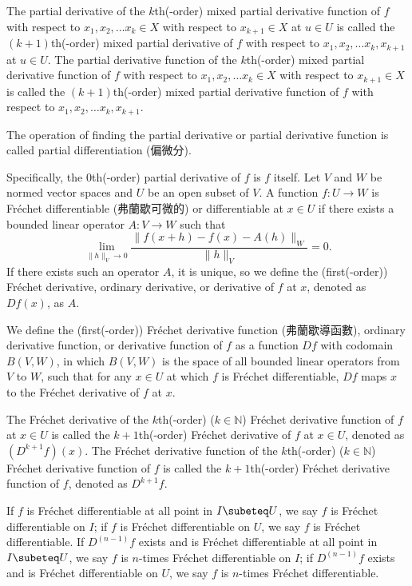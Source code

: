 \documentclass[a4paper,12pt]{report}
\begin{document}
The partial derivative of the $k$th(-order) mixed partial derivative function of $f$ with respect to $ x_1, x_2,\dots  x_k\in X$ with respect to $ x_{k+1}\in X$ at $u\in U$ is called the $(k+1)$th(-order) mixed partial derivative of $f$ with respect to $ x_1, x_2,\dots  x_k, x_{k+1}$ at $u\in U$. The partial derivative function of the $k$th(-order) mixed partial derivative function of $f$ with respect to $ x_1, x_2,\dots  x_k\in X$ with respect to $ x_{k+1}\in X$ is called the $(k+1)$th(-order) mixed partial derivative function of $f$ with respect to $ x_1, x_2,\dots  x_k, x_{k+1}$.

The operation of finding the partial derivative or partial derivative function is called partial differentiation (偏微分).

Specifically, the $0$th(-order) partial derivative of $f$ is $f$ itself.
Let $V$ and $W$ be normed vector spaces and $U$ be an open subset of $V$. A function $f\colon U\to W$ is Fréchet differentiable (弗蘭歇可微的) or differentiable at $x\in U$ if there exists a bounded linear operator $A\colon V\to W$ such that
\[\lim_{\|h\|_V\to 0}\frac{\|f(x+h)-f(x)-A(h)\|_W}{\|h\|_V}=0.\]
If there exists such an operator $A$, it is unique, so we define the (first(-order)) Fréchet derivative, ordinary derivative, or derivative of $f$ at $x$, denoted as $Df(x)$, as $A$.

We define the (first(-order)) Fréchet derivative function (弗蘭歇導函數), ordinary derivative function, or derivative function of $f$ as a function $Df$ with codomain $B(V,W)$, in which $B(V,W)$ is the space of all bounded linear operators from $V$ to $W$, such that for any $x\in U$ at which $f$ is Fréchet differentiable, $Df$ maps $x$ to the Fréchet derivative of $f$ at $x$.

The Fréchet derivative of the $k$th(-order) ($k\in\mathbb{N}$) Fréchet derivative function of $f$ at $x\in U$ is called the $k+1$th(-order) Fréchet derivative of $f$ at $x\in U$, denoted as $(D^{k+1}f)(x)$. The Fréchet derivative function of the $k$th(-order) ($k\in\mathbb{N}$) Fréchet derivative function of $f$ is called the $k+1$th(-order) Fréchet derivative function of $f$, denoted as $D^{k+1}f$.

If $f$ is Fréchet differentiable at all point in $I\subeteq U$, we say $f$ is Fréchet differentiable on $I$; if $f$ is Fréchet differentiable on $U$, we say $f$ is Fréchet differentiable. If $D^{(n-1)}f$ exists and is Fréchet differentiable at all point in $I\subeteq U$, we say $f$ is $n$-times Fréchet differentiable on $I$; if $D^{(n-1)}f$ exists and is Fréchet differentiable on $U$, we say $f$ is $n$-times Fréchet differentiable.
\end{document}
